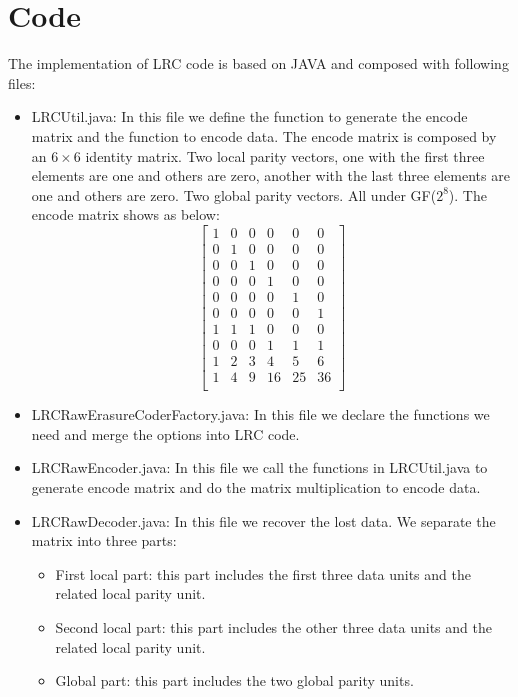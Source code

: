 \documentclass[10pt]{article}
\begin{document}
\section{Code}
The implementation of LRC code is based on JAVA and composed with following files:
\begin{itemize}
\item LRCUtil.java: In this file we define the function to generate the encode matrix and the function to encode data. The encode matrix is composed by an $6\times 6$ identity matrix. Two local parity vectors, one with the first three elements are one and others are zero, another with the last three elements are one and others are zero. Two global parity vectors. All under GF($2^8$). The encode matrix shows as below:
$$
  \left[
  \begin{matrix}
   1 & 0 & 0 & 0 & 0 & 0 \\
   0 & 1 & 0 & 0 & 0 & 0 \\
   0 & 0 & 1 & 0 & 0 & 0 \\
   0 & 0 & 0 & 1 & 0 & 0 \\
   0 & 0 & 0 & 0 & 1 & 0 \\
   0 & 0 & 0 & 0 & 0 & 1 \\
   1 & 1 & 1 & 0 & 0 & 0 \\
   0 & 0 & 0 & 1 & 1 & 1 \\
   1 & 2 & 3 & 4 & 5 & 6 \\
   1 & 4 & 9 & 16 & 25 & 36 \\
  \end{matrix}
  \right]
$$
\item LRCRawErasureCoderFactory.java: In this file we declare the functions we need and merge the options into LRC code.
\item LRCRawEncoder.java: In this file we call the functions in LRCUtil.java to generate encode matrix and do the matrix multiplication to encode data.
\item LRCRawDecoder.java: In this file we recover the lost data. We separate the matrix into three parts:
\begin{itemize}
\item First local part: this part includes the first three data units and the related local parity unit.
\item Second local part: this part includes the other three data units and the related local parity unit.
\item Global part: this part includes the two global parity units.
\end{itemize}

\end{itemize}
\end{document}
